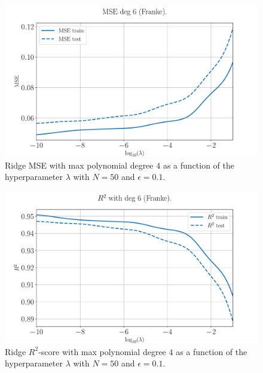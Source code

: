 \documentclass[%
reprint,
amsmath,amssymb,
aps,
pra,
]{revtex4-2}
\begin{document}
\begin{figure}[H]
	\centering
	\includegraphics[width=\linewidth]{Python/Figures/Ridge/RIDGE_logMSE_no_scaling.pdf}
	\caption{Ridge MSE with max polynomial degree $4$ as a function of the hyperparameter $\lambda$ with $N=50$ and $\epsilon=0.1$.}
	\label{fig:ridge_logMSE_degree}
\end{figure}
\begin{figure}[H]
	\centering
	\includegraphics[width=\linewidth]{Python/Figures/Ridge/RIDGE_logR2_no_scaling.pdf}
	\caption{Ridge $R^2$-score with max polynomial degree $4$ as a function of the hyperparameter $\lambda$ with $N=50$ and $\epsilon=0.1$.}
	\label{fig:ridge_logR2_degree}
\end{figure}
\end{document}
